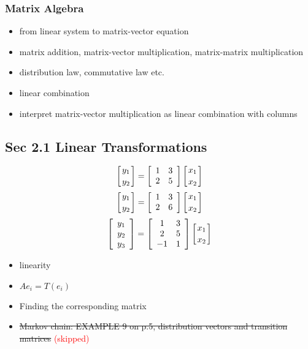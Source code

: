\documentclass[12pt,a4paper]{article}
\newcommand{\red}[1]{\textcolor{red}{#1}}
\renewcommand{\l}{\left}
\renewcommand{\r}{\right}
\begin{document}
\subsubsection*{Matrix Algebra}
\begin{itemize}
	\item from linear system to matrix-vector equation
	\item matrix addition, matrix-vector multiplication, matrix-matrix multiplication
	\item distribution law, commutative law etc.
	\item linear combination
	\item interpret matrix-vector multiplication as linear combination with columns
\end{itemize}

\subsection*{Sec 2.1 Linear Transformations}
\begin{equation}
	\l[
	{y_1 \atop y_2}
	\r]
	=
	\l[
	\begin{array}{cc}
		1 & 3\\
		2 & 5
	\end{array}
	\r]
	\l[
	{x_1 \atop x_2}
	\r]
\end{equation}
\begin{equation}
	\l[
	{y_1 \atop y_2}
	\r]
	=
	\l[
	\begin{array}{cc}
		1 & 3\\
		2 & 6
	\end{array}
	\r]
	\l[
	{x_1 \atop x_2}
	\r]
\end{equation}
\begin{equation}
	\l[
    \begin{array}{c}
        y_1\\
        y_2\\
        y_3
    \end{array}
	\r]
	=
	\l[
	\begin{array}{cc}
		1 & 3\\
		2 & 5\\
        -1 & 1
	\end{array}
	\r]
	\l[
	{x_1 \atop x_2}
	\r]
\end{equation}
\begin{itemize}
    \item linearity
    \item $Ae_i = T(e_i)$
    \item Finding the corresponding matrix
    \item \st{Markov chain: EXAMPLE 9 on p.5, distribution vectors and transition matrices} \red{(skipped)}
\end{itemize}
\end{document}
